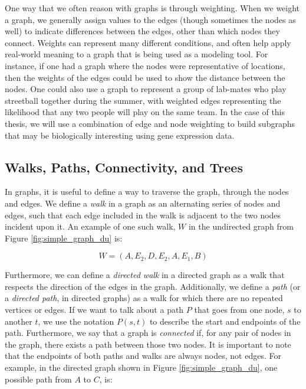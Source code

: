 \documentclass[12pt,twoside]{reedthesis}
\theoremstyle{definition}
\begin{document}
  One way that we often reason with graphs is through weighting. When we weight a graph, we generally assign values to the edges (though sometimes the nodes as well) to indicate differences between the edges, other than which nodes they connect. Weights can represent many different conditions, and often help apply real-world meaning to a graph that is being used as a modeling tool. For instance, if one had a graph where the nodes were representative of locations, then the weights of the edges could be used to show the distance between the nodes. One could also use a graph to represent a group of lab-mates who play streetball together during the summer, with weighted edges representing the likelihood that any two people will play on the same team. In the case of this thesis, we will use a combination of edge and node weighting to build subgraphs that may be biologically interesting using gene expression data.\par

   \subsection{Walks, Paths, Connectivity, and Trees}

   In graphs, it is useful to define a way to traverse the graph, through the nodes and edges. We define a \textit{walk} in a graph as an alternating series of nodes and edges, such that each edge included in the walk is adjacent to the two nodes incident upon it. An example of one such walk, $W$ in the undirected graph from Figure \ref{fig:simple_graph_du} is:\par

   \begin{equation*}
     W = (A,E_2,D,E_2,A,E_1,B)
   \end{equation*}

   Furthermore, we can define a \textit{directed walk} in a directed graph as a walk that respects the direction of the edges in the graph. Additionally, we define a \textit{path} (or a \textit{directed path}, in directed graphs) as a walk for which there are no repeated vertices or edges. If we want to talk about a path $P$ that goes from one node, $s$ to another $t$, we use the notation $P(s,t)$ to describe the start and endpoints of the path. Furthermore, we say that a graph is \textit{connected} if, for any pair of nodes in the graph, there exists a path between those two nodes. It is important to note that the endpoints of both paths and walks are always nodes, not edges. For example, in the directed graph shown in Figure \ref{fig:simple_graph_du}, one possible path from $A$ to $C$, is:\par
\end{document}
